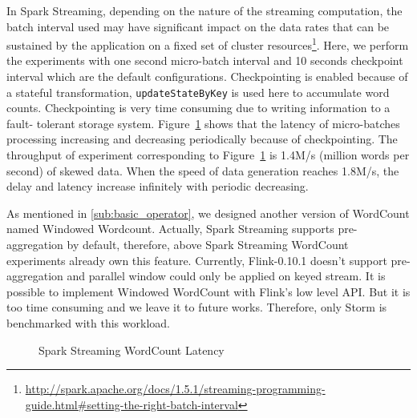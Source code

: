 In Spark Streaming, depending on the nature of the streaming computation, the batch interval used may have significant impact on the data rates that can be sustained by the application on a fixed set of cluster resources\footnote{\url{http://spark.apache.org/docs/1.5.1/streaming-programming-guide.html\#setting-the-right-batch-interval}}. Here, we perform the experiments with one second micro-batch interval and 10 seconds checkpoint interval which are the default configurations. Checkpointing is enabled because of a stateful transformation, \texttt{updateStateByKey} is used here to accumulate word counts.  Checkpointing is very time consuming due to writing information to a fault- tolerant storage system. Figure~\ref{fig:spark_wordcount_latency} shows that the latency of micro-batches processing increasing and decreasing periodically because of checkpointing. The throughput of experiment corresponding to Figure~\ref{fig:spark_wordcount_latency} is 1.4M/s (million words per second) of skewed data. When the speed of data generation reaches 1.8M/s, the delay and latency increase infinitely with periodic decreasing.

As mentioned in \cref{sub:basic_operator}, we designed another version of WordCount named Windowed Wordcount. Actually, Spark Streaming supports pre-aggregation by default, therefore, above Spark Streaming WordCount experiments already own this feature. Currently, Flink-0.10.1 doesn't support pre-aggregation and parallel window could only be applied on keyed stream. It is possible to implement Windowed WordCount with Flink's low level API. But it is too time consuming and we leave it to future works. Therefore, only Storm is benchmarked with this workload.

\begin{figure}
  \begin{center}
   \caption{Spark Streaming WordCount Latency}
   \label{fig:spark_wordcount_latency}
  \end{center}
\end{figure}

